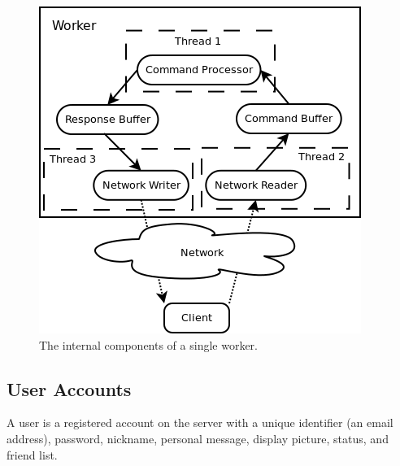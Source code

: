 \begin{figure}
    \begin{center}
        \includegraphics[scale=0.6]{Design/diagrams/worker_detail.png}
        \caption{The internal components of a single worker.}
        \label{WorkerDatailedDia}
    \end{center}
\end{figure}

\subsection{User Accounts}
A user is a registered account on the server with a unique identifier (an email address), password, nickname, personal message, display picture, status, and friend list. 

